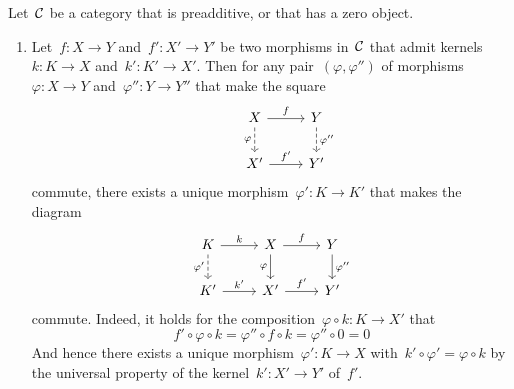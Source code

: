\begin{remark*}
  \label{functoriality of (co)kernel}
  Let~$\mathcal{C}$ be a category that is preadditive, or that has a zero object.
  \begin{enumerate}
    \item
      Let~$f \colon X \to Y$ and~$f' \colon X' \to Y'$ be two morphisms in~$\mathcal{C}$ that admit kernels~$k \colon K \to X$ and~$k' \colon K' \to X'$.
      Then for any pair~$(\varphi,\varphi'')$ of morphisms~$\varphi \colon X \to Y$ and~$\varphi'' \colon Y \to Y''$ that make the square
      \[
        \begin{tikzcd}
          & X
            \arrow{r}[above]{f}
            \arrow[dashed]{d}[left]{\varphi}
          & Y
            \arrow[dashed]{d}[right]{\varphi''}
          \\
          & X'
            \arrow{r}[above]{f'}
          & Y'
        \end{tikzcd}
      \]
      commute, there exists a unique morphism~$\varphi' \colon K \to K'$ that makes the diagram
      \[
        \begin{tikzcd}
            K
            \arrow{r}[above]{k}
            \arrow[dashed]{d}[left]{\varphi'}
          & X
            \arrow{r}[above]{f}
            \arrow{d}[left]{\varphi}
          & Y
            \arrow{d}[right]{\varphi''}
          \\
            K'
            \arrow{r}[above]{k'}
          & X'
            \arrow{r}[above]{f'}
          & Y'
        \end{tikzcd}
      \]
      commute.
      Indeed, it holds for the composition~$\varphi \circ k \colon K \to X'$ that
      \[
          f' \circ \varphi \circ k
        = \varphi'' \circ f \circ k
        = \varphi'' \circ 0
        = 0
      \]
      And hence there exists a unique morphism~$\varphi' \colon K \to X$ with~$k' \circ \varphi' = \varphi \circ k$ by the universal property of the kernel~$k' \colon X' \to Y'$ of~$f'$.
      

\end{enumerate}
\end{remark*}
